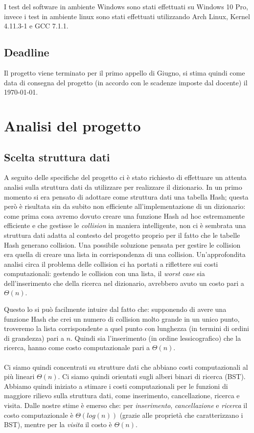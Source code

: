 \documentclass[paper=a4, fontsize=11pt,twoside]{scrartcl}   %
\begin{document}
			 	I test del software in ambiente Windows sono stati effettuati su Windows 10 Pro, invece i test in ambiente linux sono stati effettuati utilizzando Arch Linux, Kernel 4.11.3-1 e GCC 7.1.1.
			 \subsection{Deadline}
			 	Il progetto viene terminato per il primo appello di Giugno, si stima quindi come data di consegna del progetto (in accordo con le scadenze imposte dal docente) il \today.
			 	
		\section{Analisi del progetto}
			\subsection{Scelta struttura dati}
				 A seguito delle specifiche del progetto ci è stato richiesto di effettuare un attenta analisi sulla struttura dati da utilizzare per realizzare il dizionario. In un primo momento si era pensato di adottare come struttura dati una tabella Hash; questa però è risultata sin da subito non efficiente all'implementazione di un dizionario: come prima cosa avremo dovuto creare una funzione Hash ad hoc estremamente efficiente e che gestisse le \textit{collision} in maniera intelligente, non ci è sembrata una struttura dati adatta al contesto del progetto proprio per il fatto che le tabelle Hash generano collision. Una possibile soluzione pensata per gestire le collision era quella di creare una lista in corrispondenza di una collision. Un'approfondita analisi circa il problema delle collision ci ha portati a riflettere sui costi computazionali: gestendo le collision con una lista, il \textit{worst case} sia dell'inserimento che della ricerca nel dizionario, avrebbero avuto un costo pari a $\Theta(n)$.
				 
				 Questo lo si può facilmente intuire dal fatto che: supponendo di avere una funzione Hash che crei un numero di collision molto grande in un unico punto, troveremo la lista corrispondente a quel punto con lunghezza (in termini di ordini di grandezza) pari a $n$. Quindi sia l'inserimento (in ordine lessicografico) che la ricerca, hanno come costo computazionale pari a $\Theta(n)$.\\\\
				 Ci siamo quindi concentrati su strutture dati che abbiano costi computazionali al più lineari $\Theta(n)$. Ci siamo quindi orientati sugli alberi binari di ricerca (BST).				 
				 Abbiamo quindi iniziato a stimare i costi computazionali per le funzioni di maggiore rilievo sulla struttura dati, come inserimento, cancellazione, ricerca e visita. Dalle nostre stime è emerso che: per \textit{inserimento}, \textit{cancellazione} e \textit{ricerca} il costo computazionale è $\Theta(log(n))$ (grazie alle proprietà che caratterizzano i BST), mentre per la \textit{visita} il costo è $\Theta(n)$.
				 
\end{document}
